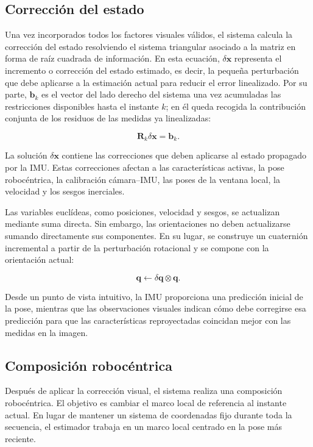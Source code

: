 \subsection{Corrección del estado}

Una vez incorporados todos los factores visuales válidos, el sistema calcula la corrección
del estado resolviendo el sistema triangular asociado a la matriz en forma de raíz cuadrada de
información. En esta ecuación, \(\delta \mathbf{x}\) representa el incremento o corrección
del estado estimado, es decir, la pequeña perturbación que debe aplicarse a la estimación
actual para reducir el error linealizado. Por su parte, \(\mathbf{b}_k\) es el vector del
lado derecho del sistema una vez acumuladas las restricciones disponibles hasta el instante
\(k\); en él queda recogida la contribución conjunta de los residuos de las medidas ya
linealizadas:

\[
\mathbf{R}_k\delta\mathbf{x}
=
\mathbf{b}_k.
\]

La solución $\delta\mathbf{x}$ contiene las correcciones que deben aplicarse al estado
propagado por la IMU. Estas correcciones afectan a las características activas, la pose
robocéntrica, la calibración cámara--IMU, las poses de la ventana local, la velocidad y los
sesgos inerciales.

Las variables euclídeas, como posiciones, velocidad y sesgos, se actualizan mediante suma
directa. Sin embargo, las orientaciones no deben actualizarse sumando directamente sus
componentes. En su lugar, se construye un cuaternión incremental a partir de la perturbación
rotacional y se compone con la orientación actual:

\[
\mathbf{q}
\leftarrow
\delta\mathbf{q} \otimes \mathbf{q}.
\]


Desde un punto de vista intuitivo, la IMU proporciona una predicción inicial de la pose,
mientras que las observaciones visuales indican cómo debe corregirse esa predicción para
que las características reproyectadas coincidan mejor con las medidas en la imagen.

\subsection{Composición robocéntrica}

Después de aplicar la corrección visual, el sistema realiza una composición robocéntrica.
El objetivo es cambiar el marco local de referencia al instante actual. En lugar de mantener
un sistema de coordenadas fijo durante toda la secuencia, el estimador trabaja en un marco
local centrado en la pose más reciente.

